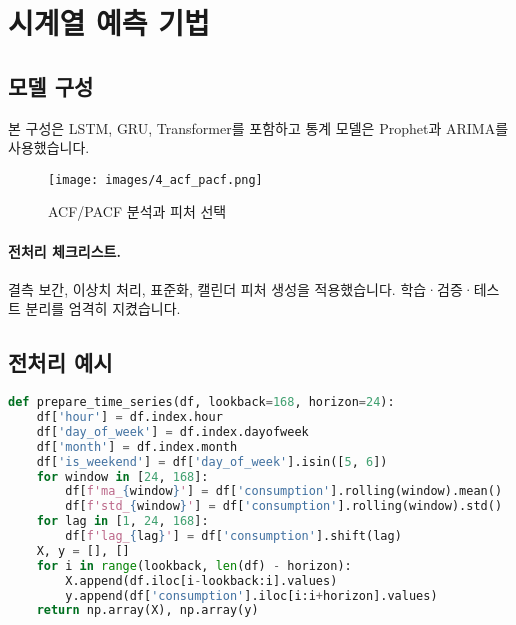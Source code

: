 \section{시계열 예측 기법}

\subsection{모델 구성}
본 구성은 LSTM, GRU, Transformer를 포함하고 통계 모델은 Prophet과 ARIMA를 사용했습니다.

\begin{figure}[H]
    \centering
    \texttt{[image: images/4\_acf\_pacf.png]}
    \caption{ACF/PACF 분석과 피처 선택}
    \label{fig:acf_pacf}
\end{figure}

\paragraph{전처리 체크리스트.} 결측 보간, 이상치 처리, 표준화, 캘린더 피처 생성을 적용했습니다. 학습·검증·테스트 분리를 엄격히 지켰습니다.

\subsection{전처리 예시}
\begin{lstlisting}[language=Python]
def prepare_time_series(df, lookback=168, horizon=24):
    df['hour'] = df.index.hour
    df['day_of_week'] = df.index.dayofweek
    df['month'] = df.index.month
    df['is_weekend'] = df['day_of_week'].isin([5, 6])
    for window in [24, 168]:
        df[f'ma_{window}'] = df['consumption'].rolling(window).mean()
        df[f'std_{window}'] = df['consumption'].rolling(window).std()
    for lag in [1, 24, 168]:
        df[f'lag_{lag}'] = df['consumption'].shift(lag)
    X, y = [], []
    for i in range(lookback, len(df) - horizon):
        X.append(df.iloc[i-lookback:i].values)
        y.append(df['consumption'].iloc[i:i+horizon].values)
    return np.array(X), np.array(y)
\end{lstlisting}

